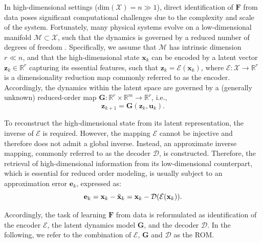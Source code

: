 \documentclass{article}
\begin{document}
In high-dimensional settings ($\mathrm{dim}(\mathcal{X})=n \gg 1$), direct identification of $\mathbf{F}$ from data poses significant computational challenges due to the complexity and scale of the system.
Fortunately, many physical systems evolve on a low-dimensional manifold $\mathcal{M}\subset \mathcal{X}$, such that the dynamics is governed by a reduced number of degrees of freedom \citep{holmes2012turbulence}.
Specifically, we assume that $\mathcal{M}$ has intrinsic dimension $r \ll n$, and that the high-dimensional state $\mathbf{x}_k$ can be encoded by a latent vector $\mathbf{z}_k \in \mathbb{R}^r$ capturing its essential features, such that $\mathbf{z}_k = \mathcal{E}(\mathbf{x}_k)$, where $\mathcal{E}:\mathcal{X} \rightarrow \mathbb{R}^r$ is a dimensionality reduction map commonly referred to as the encoder.
Accordingly, the dynamics within the latent space are governed by a (generally unknown) reduced-order map $\mathbf{G}:\mathbb{R}^r \times \mathbb{R}^m \rightarrow\mathbb{R}^r$, i.e.,
\begin{equation}
    \label{eq:low-dim-dyn}
    \mathbf{z}_{k+1} = \mathbf{G}(\mathbf{z}_k,\mathbf{u}_k).
\end{equation}

To reconstruct the high-dimensional state from its latent representation, the inverse of $\mathcal{E}$ is required.
However, the mapping $\mathcal{E}$ cannot be injective and therefore does not admit a global inverse.
Instead, an approximate inverse mapping, commonly referred to as the decoder $\mathcal{D}$, is constructed.
Therefore, the retrieval of high-dimensional information from its low-dimensional counterpart, which is essential for reduced order modeling, is usually subject to an approximation error $\mathbf{e}_k$, expressed as:
\begin{equation}
    \label{eq:error}
    \mathbf{e}_k = \mathbf{x}_k - \Tilde{\mathbf{x}}_k = \mathbf{x}_k - \mathcal{D}(\mathcal{E}(\mathbf{x}_k)).
\end{equation}

Accordingly, the task of learning $\mathbf{F}$ from data is reformulated as identification of the encoder $\mathcal{E}$, the latent dynamics model $\mathbf{G}$, and the decoder $\mathcal{D}$.
In the following, we refer to the combination of $\mathcal{E}$, $\mathbf{G}$ and $\mathcal{D}$ as the ROM.  
\end{document}
